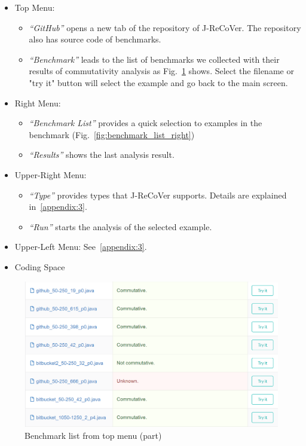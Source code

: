 \begin{itemize}
\item
Top Menu:
\begin{itemize}
\item
\emph{``GitHub''} opens a new tab of the repository of J-ReCoVer. The repository also has source code of benchmarks.
\item
\emph{``Benchmark''} leads to the list of benchmarks we collected with their results of commutativity analysis as Fig.~\ref{fig:benchmark_list} shows. Select the filename or "try it" button will select the example and go back to the main screen.
\end{itemize}
\item
Right Menu:
\begin{itemize}
\item
\emph{``Benchmark List''} provides a quick selection to examples in the benchmark (Fig.~\ref{fig:benchmark_list_right})
\item
\emph{``Results''} shows the last analysis result.
\end{itemize}
\item
Upper-Right Menu:
\begin{itemize}
\item
\emph{``Type''} provides types that J-ReCoVer supports. Details are explained in~\ref{appendix:3}.
\item
\emph{``Run''} starts the analysis of the selected example.
\end{itemize}
\item
Upper-Left Menu: See~\ref{appendix:3}.
\item
Coding Space
\end{itemize}

\begin{figure}
\begin{center}
\includegraphics[width=.8\linewidth]{screenshots/benchmark_list}
\caption{Benchmark list from top menu (part)}
\label{fig:benchmark_list}
\end{center}
\end{figure}

